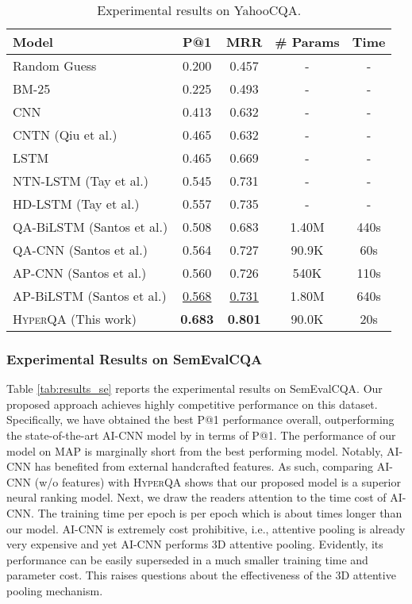 \documentclass[sigconf]{acmart}
\begin{document}
\begin{table}[ht]
  \centering
\small
    \begin{tabular}{lcccc}
    \hline
          
         Model & P@1   & MRR   & \# Params & Time \\
          \hline
    Random Guess & 0.200 & 0.457 & -      & - \\
    BM-25 & 0.225 & 0.493 &  -     & - \\

    CNN  & 0.413 & 0.632 &  -     & - \\
    CNTN (Qiu et al.)  & 0.465 & 0.632 & -      & - \\
    LSTM & 0.465 & 0.669 &  -     & - \\
    NTN-LSTM (Tay et al.)  & 0.545 & 0.731 & -     & - \\
    HD-LSTM (Tay et al.)  & 0.557 & 0.735 & -      & - \\

    QA-BiLSTM (Santos et al.)& 0.508 &0.683 &1.40M & 440s \\
    QA-CNN (Santos et al.) & 0.564& 0.727&  90.9K & 60s \\
    AP-CNN (Santos et al.) & 0.560& 0.726& 540K & 110s \\
    AP-BiLSTM (Santos et al.) & \underline{0.568}& \underline{0.731}& 1.80M& 640s \\
\hline
    \textsc{HyperQA} (This work) & \textbf{0.683} & \textbf{0.801} & 90.0K   & 20s \\
    \hline
    \end{tabular}\caption{Experimental results on YahooCQA.}
  \label{tab:yahooQAresults}\end{table}


\subsubsection{Experimental Results on SemEvalCQA}
Table \ref{tab:results_se} reports the experimental results on SemEvalCQA. Our proposed approach achieves highly competitive performance on this dataset. Specifically, we have obtained the best P@1 performance overall, outperforming
the state-of-the-art AI-CNN  model by  in terms of P@1. The performance of our model on MAP is marginally short from the best performing model. Notably, AI-CNN has benefited from external handcrafted features. As such, comparing AI-CNN (w/o features) with \textsc{HyperQA} shows that our proposed model is a superior neural ranking model. Next, we draw the readers attention to the time cost of AI-CNN. The training time per epoch is  per epoch which is about  times longer than our model. AI-CNN is extremely cost prohibitive, i.e., attentive pooling is already very expensive and yet AI-CNN performs 3D attentive pooling. Evidently, its performance can be easily superseded in a much smaller training time and parameter cost. This raises questions about the effectiveness of the 3D attentive pooling mechanism.
\end{document}
